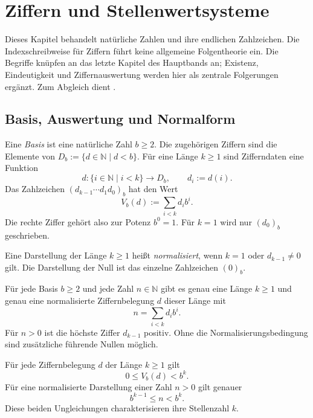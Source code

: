 \chapter{Ziffern und Stellenwertsysteme}
\label{b10guide:ch:numerals}

Dieses Kapitel behandelt natürliche Zahlen und ihre endlichen Zahlzeichen.
Die Indexschreibweise für Ziffern führt keine allgemeine Folgentheorie ein.
Die Begriffe knüpfen an das letzte Kapitel des Hauptbands an;
Existenz, Eindeutigkeit und Ziffernauswertung werden hier als
zentrale Folgerungen ergänzt. Zum Abgleich dient \cite{natdigits}.

\section{Basis, Auswertung und Normalform}

\begin{definition}
\label{b10guide:def:digits}
Eine \emph{Basis} ist eine natürliche Zahl $b\ge2$.
Die zugehörigen Ziffern sind die Elemente von
$D_b:=\{d\in\mathbb N\mid d<b\}$.
Für eine Länge $k\ge1$ sind Zifferndaten eine Funktion
\[
 d\colon\{i\in\mathbb N\mid i<k\}\longrightarrow D_b,
 \qquad d_i:=d(i).
\]
Das Zahlzeichen $(d_{k-1}\cdots d_1d_0)_b$ hat den Wert
\[
 V_b(d):=\sum_{i<k}d_i b^i.
\]
Die rechte Ziffer gehört also zur Potenz $b^0=1$.
Für $k=1$ wird nur $(d_0)_b$ geschrieben.
\end{definition}

\begin{definition}
Eine Darstellung der Länge $k\ge1$ heißt \emph{normalisiert},
wenn $k=1$ oder $d_{k-1}\ne0$ gilt.
Die Darstellung der Null ist das einzelne Zahlzeichen $(0)_b$.
\end{definition}

\begin{theorem}
\label{b10guide:thm:digits}
Für jede Basis $b\ge2$ und jede Zahl $n\in\mathbb N$ gibt es
genau eine Länge $k\ge1$ und genau eine normalisierte Ziffernbelegung
$d$ dieser Länge mit
\[
 n=\sum_{i<k}d_i b^i.
\]
Für $n>0$ ist die höchste Ziffer $d_{k-1}$ positiv.
Ohne die Normalisierungsbedingung sind zusätzliche führende Nullen möglich.
\end{theorem}

\begin{theorem}
Für jede Ziffernbelegung $d$ der Länge $k\ge1$ gilt
\[
 0\le V_b(d)<b^k.
\]
Für eine normalisierte Darstellung einer Zahl $n>0$ gilt genauer
\[
 b^{k-1}\le n<b^k.
\]
Diese beiden Ungleichungen charakterisieren ihre Stellenzahl $k$.
\end{theorem}

